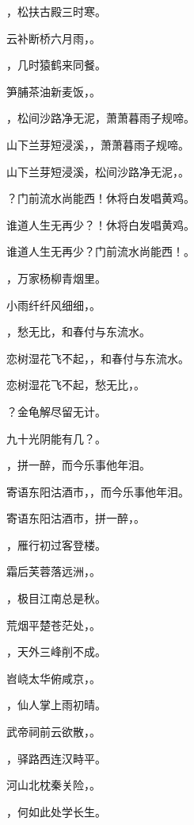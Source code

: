 \documentclass[12pt, a4paper, addpoints, answers]{exam}
\begin{document}
\begin{questions}
\question[3] \fillin，松扶古殿三时寒。

\question[3] 云补断桥六月雨，\fillin。

\question[3] \fillin，几时猿鹤来同餐。

\question[3] 笋脯茶油新麦饭，\fillin。

\question[3] \fillin，松间沙路净无泥，萧萧暮雨子规啼。

\question[3] 山下兰芽短浸溪，\fillin，萧萧暮雨子规啼。

\question[3] 山下兰芽短浸溪，松间沙路净无泥，\fillin。

\question[3] \fillin？门前流水尚能西！休将白发唱黄鸡。

\question[3] 谁道人生无再少？\fillin！休将白发唱黄鸡。

\question[3] 谁道人生无再少？门前流水尚能西！\fillin。

\question[3] \fillin，万家杨柳青烟里。

\question[3] 小雨纤纤风细细，\fillin。

\question[3] \fillin，愁无比，和春付与东流水。

\question[3] 恋树湿花飞不起，\fillin，和春付与东流水。

\question[3] 恋树湿花飞不起，愁无比，\fillin。

\question[3] \fillin？金龟解尽留无计。

\question[3] 九十光阴能有几？\fillin。

\question[3] \fillin，拼一醉，而今乐事他年泪。

\question[3] 寄语东阳沽酒市，\fillin，而今乐事他年泪。

\question[3] 寄语东阳沽酒市，拼一醉，\fillin。

\question[3] \fillin，雁行初过客登楼。

\question[3] 霜后芙蓉落远洲，\fillin。

\question[3] \fillin，极目江南总是秋。

\question[3] 荒烟平楚苍茫处，\fillin。

\question[3] \fillin，天外三峰削不成。

\question[3] 岧峣太华俯咸京，\fillin。

\question[3] \fillin，仙人掌上雨初晴。

\question[3] 武帝祠前云欲散，\fillin。

\question[3] \fillin，驿路西连汉畤平。

\question[3] 河山北枕秦关险，\fillin。

\question[3] \fillin，何如此处学长生。


\end{questions}
\end{document}
